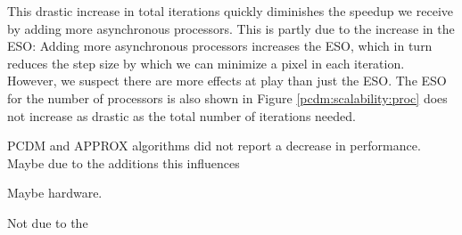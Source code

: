 This drastic increase in total iterations quickly diminishes the speedup we receive by adding more asynchronous processors. This is partly due to the increase in the ESO: Adding more asynchronous processors increases the ESO, which in turn reduces the step size by which we can minimize a pixel in each iteration. However, we suspect there are more effects at play than just the ESO. The ESO for the number of processors is also shown in Figure \ref{pcdm:scalability:proc} does not increase as drastic as the total number of iterations needed.

PCDM and APPROX algorithms did not report a decrease in performance.
Maybe due to the additions this influences

Maybe hardware.

Not due to the 